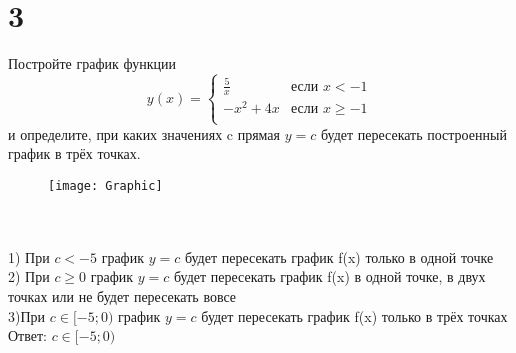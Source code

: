 \documentclass{article}
\begin{document}
	\section{3}
  
  	Постройте график функции\\
	\begin{equation*}
	y(x) = 
	\begin{cases}
	\frac{5}{x} &\text{если $x < -1$}\\
	-x^2+4x &\text{если $x \ge -1$}\\
	\end{cases}
	\end{equation*}
	и определите, при каких значениях c  прямая {$y=c$}   будет пересекать построенный график в трёх точках.\\
	\graphicspath{{Pictures/}}
	\begin{figure}[hb]
		\begin{center}
			\texttt{[image: Graphic]}
		\end{center}
	\end{figure}
	\\
	\\
	1) При {$c<-5$} график  {$y=c$} будет пересекать график f(x) только в одной точке\\
	2) При {$c \geq 0$}  график  {$y=c$} будет пересекать график f(x) в одной точке, в двух точках или не будет пересекать вовсе\\
	3)При {$c \in [-5;0)$} график  {$y=c$} будет пересекать график f(x) только в трёх точках\\
	Ответ: {$c \in [-5;0)$}
  
\end{document}
